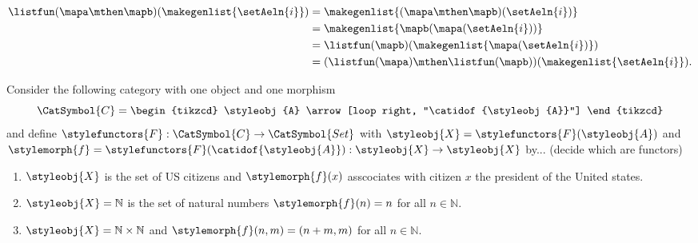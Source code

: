 \begin{example}
    \begin{equation}\label{eq:list-functor-compositionality}
        \begin{aligned}
            \listfun(\mapa \mthen \mapb)(\makegenlist{\setAeln{i}}) & =\makegenlist{ (\mapa \mthen \mapb)(\setAeln{i})} \\
                                                                    & =\makegenlist{  \mapb ( \mapa (\setAeln{i}))} \\
                                                                    & =\listfun(\mapb)(\makegenlist{\mapa(\setAeln{i})}) \\
                                                                    & =(\listfun(\mapa)\mthen \listfun(\mapb))(\makegenlist{\setAeln{i}}).
        \end{aligned}
    \end{equation}
\end{example}

\begin{quiz}
Consider the following category with one object and one morphism
$$\CatSymbol{C}=\begin{tikzcd}
\styleobj{A} \arrow[loop right, "\catidof{\styleobj{A}}"]
\end{tikzcd}$$
and define $\stylefunctors{F}:\CatSymbol{C}\to\CatSymbol{Set}$ with $\styleobj{X}=\stylefunctors{F}(\styleobj{A})$ and $\stylemorph{f}=\stylefunctors{F}(\catidof{\styleobj{A}}):\styleobj{X}\to\styleobj{X}$ by... (decide which are functors)
\begin{enumerate}[label=(\alph*)]
\item $\styleobj{X}$ is the set of US citizens and $\stylemorph{f}(x)$ asscociates with citizen $x$ the president of the United states.
\item $\styleobj{X}=\mathbb{N}$ is the set of natural numbers $\stylemorph{f}(n)=n$ for all $n\in\mathbb{N}$.
\item  $\styleobj{X}=\mathbb{N}\times\mathbb{N}$ and $\stylemorph{f}(n,m)=(n+m,m)$ for all $n\in\mathbb{N}$.
\end{enumerate}
\end{quiz}

